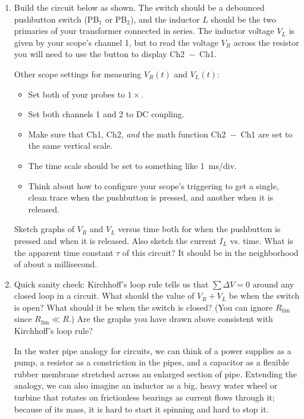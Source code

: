 \begin{enumerate}[wide]
\item Build the circuit below as shown.  The switch should be a debounced pushbutton switch (PB$_1$ or PB$_2$), and the inductor $L$ should be the two primaries of your transformer connected in series.  
The inductor voltage $V_L$ is given by your scope's channel 1, 
but to read the voltage $V_R$ across the resistor you will need to use the  button to display Ch2~$-$~Ch1.

 {
Other scope settings for measuring $V_R(t)$ and $V_L(t)$:
\begin{itemize}[nosep]
\item Set both of your probes to $1\times$.
\item Set both channels 1 and 2 to DC coupling.
\item Make sure that Ch1, Ch2, \textit{and} the math function Ch2~$-$~Ch1 are set to the same vertical scale.
\item The time scale should be set to something like 1~ms/div.
\item Think about how to configure your scope's triggering to get a single, clean trace when the pushbutton is pressed, and another when it is released.
\end{itemize}
}

Sketch graphs of $V_{R}$ and $V_L$ versus time both for when the pushbutton is pressed and when it is released. Also sketch the current $I_L$ vs. time.  What is the apparent time constant $\tau$ of this circuit?  It should be in the neighborhood of about a millisecond.  \label{part_rl_constant}

\item Quick sanity check: Kirchhoff's loop rule tells us that $\sum \Delta V = 0$ around any closed loop in a circuit. 
What should the value  of $V_{R} +V_L$ be when the switch is open? What should it be when the switch is closed? (You can ignore $R_\text{lim}$ since $R_\text{lim} \ll R$.)  Are the graphs you have drawn above consistent with Kirchhoff's loop rule?

\bigskip

In the water pipe analogy for circuits, we can think of a power supplies as a pump, a resistor as a constriction in the pipes, and a capacitor as a flexible rubber membrane stretched across an enlarged section of pipe.  Extending the analogy, we can also imagine an inductor as a big, heavy water wheel or turbine that rotates on frictionless bearings as current flows through it; because of its mass, it is hard to start it spinning and hard to stop it.


\end{enumerate}
